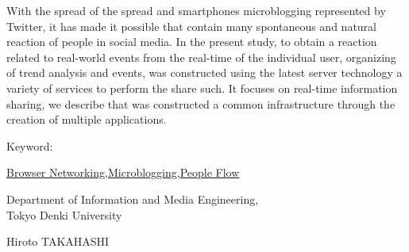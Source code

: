 With the spread of the spread and smartphones microblogging represented by Twitter, it has made it possible that contain many spontaneous and natural reaction of people in social media. In the present study, to obtain a reaction related to real-world events from the real-time of the individual user, organizing of trend analysis and events, was constructed using the latest server technology a variety of services to perform the share such. It focuses on real-time information sharing, we describe that was constructed a common infrastructure through the creation of multiple applications.


\begin{flushleft}Keyword:\\
\end{flushleft}
{\underline{Browser Networking},\underline{Microblogging},\underline{People Flow}}

\begin{flushright}
\vspace{10mm}

\vspace{5mm}
\large Department of Information and Media Engineering,\\
Tokyo Denki University\\
\begin{flushright}\LARGE Hiroto TAKAHASHI\\
\end{flushright}

\end{flushright}
